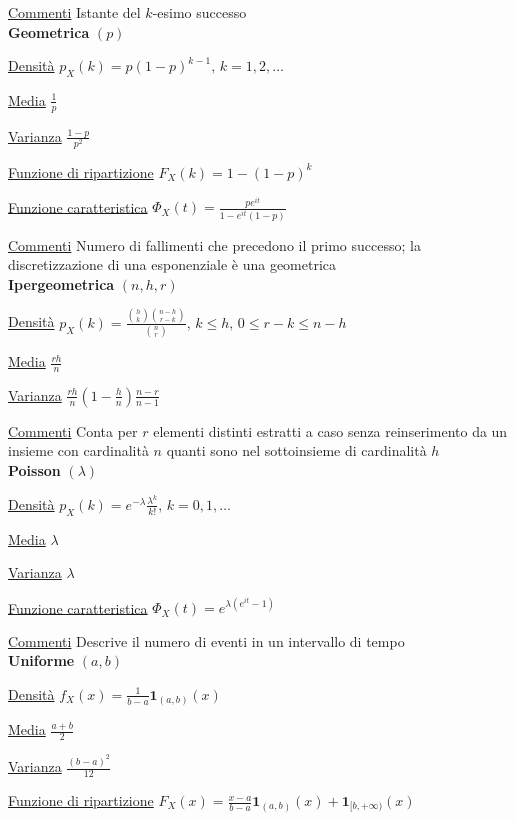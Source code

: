 \documentclass[openany]{book} %
\begin{document}
\begin{multicols}{2}
\underline{Commenti} Istante del $k$-esimo successo
\\

\textbf{Geometrica} $(p)$

\underline{Densità} $p_X(k) = p(1-p)^{k-1}, \, k =1,2,\dots$

\underline{Media} $\frac{1}{p}$

\underline{Varianza} $\frac{1-p}{p^2}$

\underline{Funzione di ripartizione} $F_X(k)=1-(1-p)^k$

\underline{Funzione caratteristica} $\Phi_X(t)= \frac{pe^{it}}{1-e^{it}(1-p)}$

\underline{Commenti} Numero di fallimenti che precedono il primo successo; la discretizzazione di una esponenziale è una geometrica
\\

\textbf{Ipergeometrica} $(n,h,r)$

\underline{Densità} $p_X(k) = \frac{\binom {h}{k}\binom {n-h}{r-k}}{\binom {n}{r}},\,k\leq h,\,0\leq r-k\leq n-h$

\underline{Media} $\frac{rh}{n}$

\underline{Varianza} $\frac{rh}{n}\left(1-\frac{h}{n}\right)\frac{n-r}{n-1}$

\underline{Commenti} Conta per $r$ elementi distinti estratti a caso senza reinserimento da un insieme con cardinalità $n$ quanti sono nel sottoinsieme di cardinalità $h$
\\

\textbf{Poisson} $(\lambda)$

\underline{Densità} $p_X(k) = e^{-\lambda}\frac{\lambda^k}{k!},\,k=0,1,\dots$

\underline{Media} $\lambda$

\underline{Varianza} $\lambda$

\underline{Funzione caratteristica} $\Phi_X(t)=e^{\lambda(e^{it}-1)}$

\underline{Commenti} Descrive il numero di eventi in un intervallo di tempo
\\

\textbf{Uniforme} $(a,b)$

\underline{Densità} $f_X(x) = \frac{1}{b-a}\boldsymbol{1}_{(a,b)}(x)$

\underline{Media} $\frac{a+b}{2}$

\underline{Varianza} $\frac{(b-a)^2}{12}$

\underline{Funzione di ripartizione} $F_X(x)=\frac{x-a}{b-a}\boldsymbol{1}_{(a,b)}(x)+\boldsymbol{1}_{[b,+\infty)}(x)$


\end{multicols}
\end{document}
